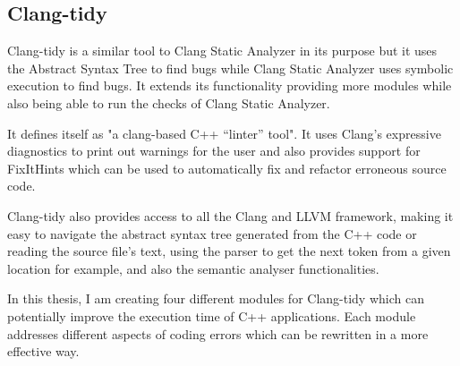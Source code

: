 \subsection{Clang-tidy}
\par Clang-tidy is a similar tool to Clang Static Analyzer in its purpose but it uses the Abstract Syntax Tree to find bugs while Clang Static Analyzer uses symbolic execution to find bugs. It extends its functionality providing more modules while also being able to run the checks of Clang Static Analyzer. \medskip
\par It defines itself as "a clang-based C++ “linter” tool"\cite{clang_tidy_mainpage}. It uses Clang's expressive diagnostics to print out warnings for the user and also provides support for FixItHints which can be used to automatically fix and refactor erroneous source code. \medskip
\par Clang-tidy also provides access to all the Clang and LLVM framework, making it easy to navigate the abstract syntax tree generated from the C++ code or reading the source file's text, using the parser to get the next token from a given location for example, and also the semantic analyser functionalities.\medskip
\par In this thesis, I am creating four different modules for Clang-tidy which can potentially improve the execution time of C++ applications. Each module addresses different aspects of coding errors which can be rewritten in a more effective way.
